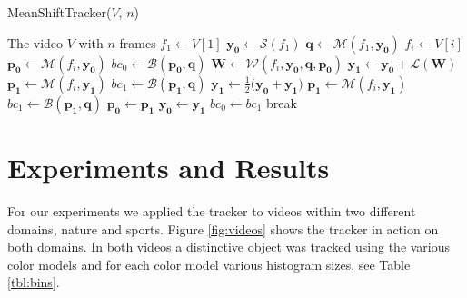 \documentclass[11pt]{article}
\begin{document}
\begin{algorithm}
	\caption{MeanShiftTracker($V$, $n$)}
	\begin{algorithmic}[1]
	\REQUIRE The video $V$ with $n$ frames
	\STATE $f_1 \leftarrow V[1]$ 
	\STATE $\mathbf{y_0} \leftarrow \mathcal{S}(f_1)$ 
	\STATE $\mathbf{q} \leftarrow \mathcal{M}(f_1, \mathbf{y_0})$ 
		\STATE $f_i \leftarrow V[i]$
		\STATE $\mathbf{p_0} \leftarrow \mathcal{M}(f_i, \mathbf{y_0})$
		\STATE $bc_0 \leftarrow \mathcal{B}(\mathbf{p_0}, \mathbf{q})$ 
			\STATE $\mathbf{W} \leftarrow \mathcal{W}(f_i, \mathbf{y_0}, \mathbf{q}, \mathbf{p_0})$ 
			\STATE $\mathbf{y_1} \leftarrow \mathbf{y_0} + \mathcal{L}(\mathbf{W})$ 
			\STATE $\mathbf{p_1} \leftarrow \mathcal{M}(f_i, \mathbf{y_1})$
			\STATE $bc_1 \leftarrow \mathcal{B}(\mathbf{p_1}, \mathbf{q})$
				\STATE $\mathbf{y_1} \leftarrow \frac{1}{2} \dot (\mathbf{y_0} + \mathbf{y_1})$ 
				\STATE $\mathbf{p_1} \leftarrow \mathcal{M}(f_i, \mathbf{y_1})$
				\STATE $bc_1 \leftarrow \mathcal{B}(\mathbf{p_1}, \mathbf{q})$
			\ENDWHILE
			\STATE $\mathbf{p_0} \leftarrow \mathbf{p_1}$
			\STATE $\mathbf{y_0} \leftarrow \mathbf{y_1}$
			\STATE $bc_0 \leftarrow bc_1$
				\STATE break 
			\ENDIF
		\ENDWHILE
	\ENDFOR
	\medskip
	\end{algorithmic}
\label{alg:mst}
\end{algorithm}

\section{Experiments and Results} \label{sec:results}
For our experiments we applied the tracker to videos within two different
domains, nature and sports. Figure \ref{fig:videos} shows the tracker in action
on both domains. In both videos a distinctive object was tracked using the various color models
and for each color model various histogram sizes, see Table \ref{tbl:bins}.
\end{document}
